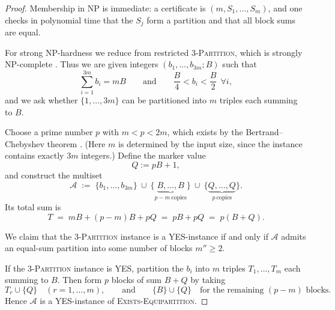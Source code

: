 \documentclass[a4paper,10pt]{amsart}
\theoremstyle{plain}
\theoremstyle{definition}
\begin{document}
\begin{proof}
Membership in NP is immediate: a certificate is $(m,S_1,\dots,S_m)$, and one checks in polynomial time
that the $S_j$ form a partition and that all block sums are equal.

For strong NP-hardness we reduce from restricted \textsc{3-Partition}, which is strongly NP-complete
\cite[SP15]{GareyJohnson}. Thus we are given integers $(b_1,\dots,b_{3m};B)$ such that
\[
\sum_{i=1}^{3m} b_i = mB
\qquad\text{and}\qquad
\frac{B}{4}<b_i<\frac{B}{2}\ \ \forall i,
\]
and we ask whether $\{1,\dots,3m\}$ can be partitioned into $m$ triples each summing to $B$.

Choose a prime number $p$ with $m<p<2m$, which exists by the Bertrand--Chebyshev theorem
\cite{ApostolANT}. (Here $m$ is determined by the input size, since the instance contains
exactly $3m$ integers.) Define the marker value
\[
Q := pB + 1,
\]
and construct the multiset
\[
\mathcal A \;:=\; \{b_1,\dots,b_{3m}\}\ \cup\ \{\underbrace{B,\dots,B}_{p-m\ \text{copies}}\}\ \cup\
\{\underbrace{Q,\dots,Q}_{p\ \text{copies}}\}.
\]
Its total sum is
\[
T \;=\; mB + (p-m)B + pQ \;=\; pB + pQ \;=\; p(B+Q).
\]

We claim that the \textsc{3-Partition} instance is a YES-instance if and only if $\mathcal A$ admits an
equal-sum partition into some number of blocks $m''\ge 2$.

If the \textsc{3-Partition} instance is YES, partition the $b_i$ into $m$ triples $T_1,\dots,T_m$ each summing to $B$.
Then form $p$ blocks of sum $B+Q$ by taking
\[
T_r\cup\{Q\}\quad(r=1,\dots,m),
\qquad\text{and}\qquad
\{B\}\cup\{Q\}\quad\text{for the remaining }(p-m)\text{ blocks}.
\]
Hence $\mathcal A$ is a YES-instance of \textsc{Exists-Equipartition}.


\end{proof}
\end{document}
